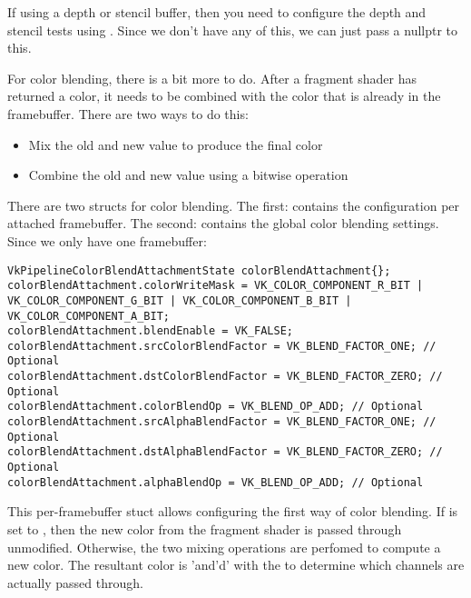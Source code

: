 \par If using a depth or stencil buffer, then you need to configure the depth and stencil tests using . Since we don't have any of this, we can just pass a nullptr to this.

\par For color blending, there is a bit more to do. After a fragment shader has returned a color, it needs to be combined with the color that is already in the framebuffer. There are two ways to do this:

\begin{itemize}
    \item Mix the old and new value to produce the final color
    \item Combine the old and new value using a bitwise operation
\end{itemize}

\par There are two structs for color blending. The first:  contains the configuration per attached framebuffer. The second:  contains the global color blending settings. Since we only have one framebuffer:

\begin{center}
\begin{minipage}{0.95\linewidth}
\begin{lstlisting}
VkPipelineColorBlendAttachmentState colorBlendAttachment{};
colorBlendAttachment.colorWriteMask = VK_COLOR_COMPONENT_R_BIT | VK_COLOR_COMPONENT_G_BIT | VK_COLOR_COMPONENT_B_BIT | VK_COLOR_COMPONENT_A_BIT;
colorBlendAttachment.blendEnable = VK_FALSE;
colorBlendAttachment.srcColorBlendFactor = VK_BLEND_FACTOR_ONE; // Optional
colorBlendAttachment.dstColorBlendFactor = VK_BLEND_FACTOR_ZERO; // Optional
colorBlendAttachment.colorBlendOp = VK_BLEND_OP_ADD; // Optional
colorBlendAttachment.srcAlphaBlendFactor = VK_BLEND_FACTOR_ONE; // Optional
colorBlendAttachment.dstAlphaBlendFactor = VK_BLEND_FACTOR_ZERO; // Optional
colorBlendAttachment.alphaBlendOp = VK_BLEND_OP_ADD; // Optional
\end{lstlisting}
\end{minipage}
\end{center}

\par This per-framebuffer stuct allows configuring the first way of color blending. If  is set to , then the new color from the fragment shader is passed through unmodified. Otherwise, the two mixing operations are perfomed to compute a new color. The resultant color is 'and'd' with the  to determine which channels are actually passed through.

